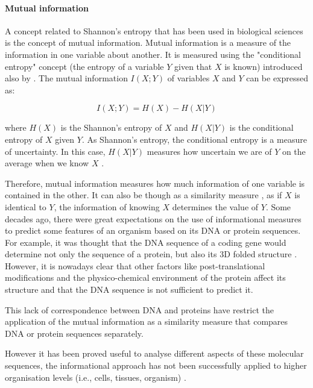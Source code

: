 \paragraph{Mutual information}

A concept related to Shannon's entropy that has been used in biological sciences is the concept of mutual information. Mutual information is a measure of the information in one variable about another. It is measured using the "conditional entropy" concept (the entropy of a variable $Y$ given that $X$ is known)  introduced also by \citet{Shannon1948}.
The mutual information $I(X;Y)$ of variables $X$ and $Y$ can be expressed as:
 
 $$I(X;Y) = H(X) - H(X|Y)$$

where $H(X)$ is the Shannon's entropy of $X$ and $H(X|Y)$ is the conditional entropy of $X$ given $Y$. As Shannon's entropy, the conditional entropy is a measure of uncertainty. In this case, $H(X|Y)$ measures how uncertain we are of $Y$ on the average when we know $X$ \citep{Shannon1948}.

Therefore, mutual information measures how much information of one variable is contained in the other. It can also be though as a similarity measure \citep{yockey2005information}, as if $X$ is identical to $Y$, the information of knowing $X$ determines the value of $Y$.
Some decades ago, there were great expectations on the use of informational measures to predict some features of an organism based on its DNA or protein sequences. For example, it was thought that the DNA sequence of a coding gene would determine not only the sequence of a protein, but also its 3D folded structure \citep{Anfinsen1973}.
However, it is nowadays clear that other factors like post-translational modifications and the physico-chemical environment of the protein affect its structure \citep{Kang2009} and that the DNA sequence is not sufficient to predict it.

This lack of correspondence between DNA and proteins have restrict the application of the mutual information as a similarity measure that compares DNA \citep{Lichtenstein2015} or protein sequences \citep{Gloor2005} separately.

However it has been proved useful to analyse different aspects of these molecular sequences, the informational approach has not been successfully applied to higher organisation levels (i.e., cells, tissues, organism) \citep{Longo2012}. 

